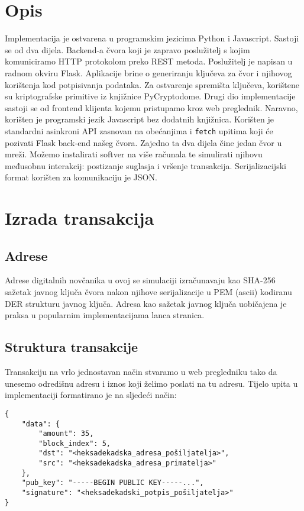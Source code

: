 \documentclass[utf8, zavrsni]{fer}
\begin{document}
\section{Opis}
Implementacija je ostvarena u programskim jezicima Python i Javascript. Sastoji se od dva dijela. Backend-a čvora koji je zapravo poslužitelj s kojim komuniciramo HTTP protokolom preko REST metoda. Poslužitelj je napisan u radnom okviru Flask. Aplikacije brine o generiranju ključeva za čvor i njihovog korištenja kod potpisivanja podataka. Za ostvarenje spremišta ključeva, korištene su kriptografske primitive iz knjižnice PyCryptodome. Drugi dio implementacije sastoji se od frontend klijenta kojemu pristupamo kroz web preglednik. Naravno, korišten je programski jezik Javascript bez dodatnih knjižnica. Korišten je standardni asinkroni API zasnovan na obećanjima i \texttt{fetch} upitima koji će pozivati Flask back-end našeg čvora. Zajedno ta dva dijela čine jedan čvor u mreži. Možemo instalirati softver na više računala te simulirati njihovu međusobnu interakcij: postizanje suglasja i vršenje transakcija. Serijalizacijski format korišten za komunikaciju je JSON.

\section{Izrada transakcija}

\subsection{Adrese}
Adrese digitalnih novčanika u ovoj se simulaciji izračunavaju kao SHA-256 sažetak javnog ključa čvora nakon njihove serijalizacije u PEM (ascii) kodiranu DER strukturu javnog ključa. Adresa kao sažetak javnog ključa uobičajena je praksa u popularnim implementacijama lanca stranica.

\subsection{Struktura transakcije}
Transakciju na vrlo jednostavan način stvaramo u web pregledniku tako da unesemo odredišnu adresu i iznos koji želimo poslati na tu adresu. Tijelo upita u implementaciji formatirano je na sljedeći način:
\begin{verbatim}
{
	"data": {
		"amount": 35,
		"block_index": 5,
		"dst": "<heksadekadska_adresa_pošiljatelja>",
		"src": "<heksadekadska_adresa_primatelja>"
	},
	"pub_key": "-----BEGIN PUBLIC KEY-----...",
	"signature": "<heksadekadski_potpis_pošiljatelja>"
}
\end{verbatim}
\end{document}
